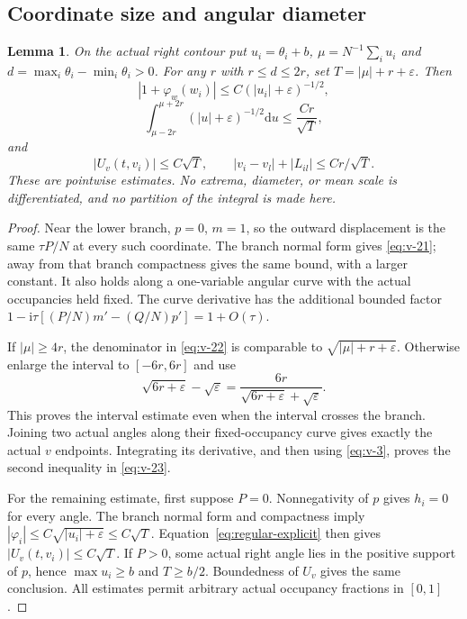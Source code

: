 \documentclass[11pt]{article}
\numberwithin{equation}{section}
\newtheorem{lemma}[theorem]{Lemma}
\theoremstyle{remark}\newtheorem{remark}[theorem]{Remark}
\newcommand{\ii}{\mathrm i}
\newcommand{\dd}{\mathrm d}
\begin{document}
\subsection{Coordinate size and angular diameter}

\begin{lemma}\label{lem:coordinate-scale}
On the actual right contour put
$u_i=\theta_i+b$, $\mu=N^{-1}\sum_i u_i$ and
$d=\max_i\theta_i-\min_i\theta_i>0$.
For any $r$ with $r\le d\le2r$, set $T=|\mu|+r+\varepsilon$.
Then
\begin{equation}\label{eq:v-21}
 |1+\varphi_w(w_i)|\le C(|u_i|+\varepsilon)^{-1/2},
\end{equation}
\begin{equation}\label{eq:v-22}
 \int_{\mu-2r}^{\mu+2r}(|u|+\varepsilon)^{-1/2}\dd u
       \le\frac{Cr}{\sqrt T},
\end{equation}
and
\begin{equation}\label{eq:v-23}
 |U_v(t,v_i)|\le C\sqrt T,\qquad
 |v_i-v_l|+|L_{il}|\le Cr/\sqrt T.
\end{equation}
These are pointwise estimates. No extrema, diameter, or mean scale
is differentiated, and no partition of the integral is made here.
\end{lemma}
\begin{proof}
Near the lower branch, $p=0$, $m=1$, so the outward displacement
is the same $\tau P/N$ at every such coordinate. The branch normal
form gives \eqref{eq:v-21}; away from that branch compactness gives
the same bound, with a larger constant. It also holds along a
one-variable angular curve with the actual occupancies held fixed.
The curve derivative has the additional bounded factor
$1-\ii\tau[(P/N)m'-(Q/N)p']=1+O(\tau)$.

If $|\mu|\ge4r$, the denominator in \eqref{eq:v-22} is comparable
to $\sqrt{|\mu|+r+\varepsilon}$. Otherwise enlarge the interval to
$[-6r,6r]$ and use
\[
 \sqrt{6r+\varepsilon}-\sqrt\varepsilon
 =\frac{6r}{\sqrt{6r+\varepsilon}+\sqrt\varepsilon}.
\]
This proves the interval estimate even when the interval crosses
the branch. Joining two actual angles along their fixed-occupancy
curve gives exactly the actual $v$ endpoints. Integrating its
derivative, and then using \eqref{eq:v-3}, proves the second
inequality in \eqref{eq:v-23}.

For the remaining estimate, first suppose $P=0$.
Nonnegativity of $p$ gives $h_i=0$ for every angle.
The branch normal form and compactness imply
$|\varphi_i|\le C\sqrt{|u_i|+\varepsilon}\le C\sqrt T$.
Equation~\eqref{eq:regular-explicit} then gives
$|U_v(t,v_i)|\le C\sqrt T$.
If $P>0$, some actual right angle lies in the positive support of
$p$, hence $\max u_i\ge b$ and $T\ge b/2$.
Boundedness of $U_v$ gives the same conclusion.
All estimates permit arbitrary actual occupancy fractions in $[0,1]$.

\end{proof}
\end{document}
